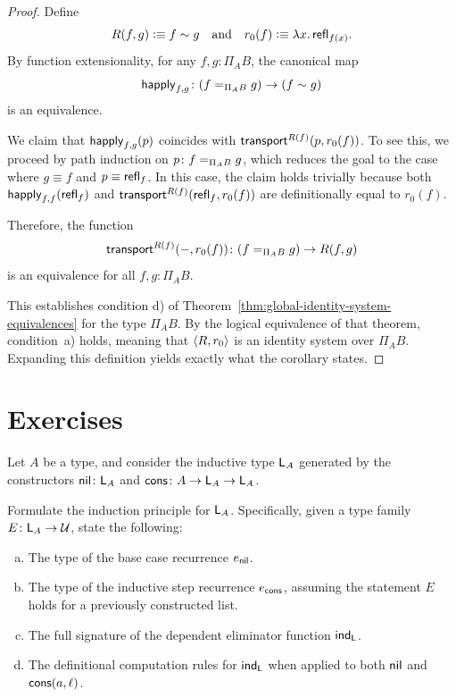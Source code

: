 \begin{proof}
    Define
    \[
        R(f,g)\mathrel{\vcentcolon}\equiv f\sim g
        \quad\text{and}\quad
        r_0(f)\mathrel{\vcentcolon}\equiv\lambda x.\,\mathsf{refl}_{f(x)}.
    \]
    By function extensionality, for any $f,g\colon \Pi_AB$, the canonical map
    \[
        \fun{happly}_{f,g}\colon(f\eq{\Pi_AB}g)\to(f\sim g)
    \]
    is an equivalence.

    We claim that $\mathsf{happly}_{f,g}(p)$ coincides with $\mathsf{transport}^{R(f)}(p,r_0(f))$. To see this, we proceed by path induction on $p\colon f\eq{\Pi_AB}g$, which reduces the goal to the case where $g\equiv f$ and $p\equiv\mathsf{refl}_f$. In this case, the claim holds trivially because both $\mathsf{happly}_{f,f}(\mathsf{refl}_f)$ and $\mathsf{transport}^{R(f)}(\mathsf{refl}_f,r_0(f))$ are definitionally equal to $r_0(f)$.
    
    Therefore, the function
    \[
        \fun{transport}^{R(f)}(\dummy,r_0(f))\colon(f\eq{\Pi_AB}g)\to R(f,g)
    \]
    is an equivalence for all $f,g\colon \Pi_AB$.

    This establishes condition d) of Theorem~\ref{thm:global-identity-system-equivalences} for the type $\Pi_AB$. By the logical equivalence of that theorem, condition~a) holds, meaning that $\langle R,r_0\rangle$ is an identity system over $\Pi_AB$. Expanding this definition yields exactly what the corollary states.
\end{proof}


\section{Exercises}

\begin{exr}
    Let $A$ be a type, and consider the inductive type\/ $\mathsf{L}_A$ generated by the constructors\/ $\fun{nil}\colon\fun L_A$ and\/ $\fun{cons}\colon A\to\fun L_A\to\fun L_A$. 
    
    Formulate the induction principle for\/ $\mathsf{L}_A$. Specifically, given a type family\/ $E\colon\fun L_A\to\univ$, state the following:
    \begin{enumerate}[a),font=\upshape]
        \item The type of the base case recurrence\/ $e_{\mathsf{nil}}$.
        \item The type of the inductive step recurrence\/ $e_{\mathsf{cons}}$, assuming the statement\/ $E$ holds for a previously constructed list.
        \item The full signature of the dependent eliminator function\/ $\mathsf{ind}_{\mathsf{L}}$.
        \item The definitional computation rules for\/ $\mathsf{ind}_{\mathsf{L}}$ when applied to both\/ $\mathsf{nil}$ and\/ $\mathsf{cons}(a,\ell)$.
    \end{enumerate}
\end{exr}

